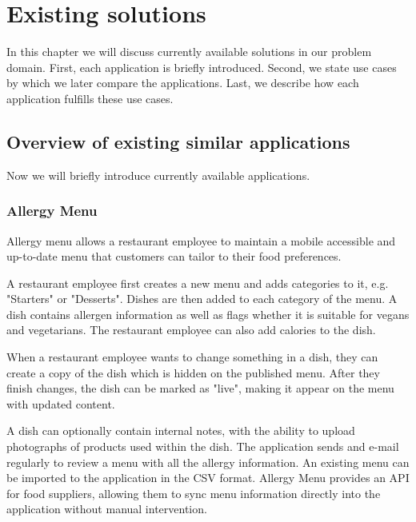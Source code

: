 \chapter{Existing solutions}
In this chapter we will discuss currently available solutions in our problem domain.
First, each application is briefly introduced.
Second, we state use cases by which we later compare the applications.
Last, we describe how each application fulfills these use cases.

\section{Overview of existing similar applications}
Now we will briefly introduce currently available applications.

\subsection*{Allergy Menu}
  Allergy menu allows a restaurant employee to maintain a mobile accessible and up-to-date menu that customers can tailor to their food preferences.
  
  A restaurant employee first creates a new menu and adds categories to it, e.g. "Starters" or "Desserts".
  Dishes are then added to each category of the menu.
  A dish contains allergen information as well as flags whether it is suitable for vegans and vegetarians.
  The restaurant employee can also add calories to the dish.

  When a restaurant employee wants to change something in a dish, they can create a copy of the dish which is hidden on the published menu.
  After they finish changes, the dish can be marked as "live", making it appear on the menu with updated content. 

  A dish can optionally contain internal notes, with the ability to upload photographs of products used within the dish.
  The application sends and e-mail regularly to review a menu with all the allergy information.
  An existing menu can be imported to the application in the CSV format.
  Allergy Menu provides an API for food suppliers, allowing them to sync menu information directly into the application without manual intervention.
  
